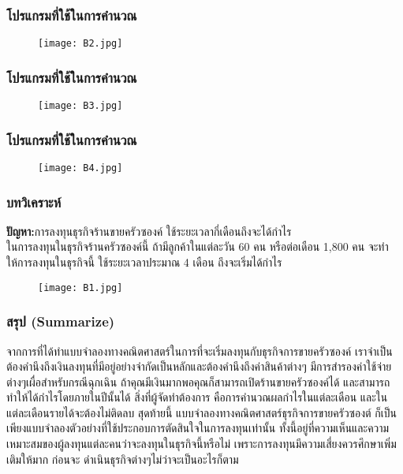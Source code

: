 \documentclass{beamer}
\begin{document}
\begin{frame}
\frametitle{โปรแกรมที่ใช้ในการคำนวณ}
\begin{figure}[h!]
\texttt{[image: B2.jpg]}
\centering
\end{figure}
\end{frame}

\begin{frame}
\frametitle{โปรแกรมที่ใช้ในการคำนวณ}
\begin{figure}[h!]
\texttt{[image: B3.jpg]}
\centering
\end{figure}
\end{frame}

\begin{frame}
\frametitle{โปรแกรมที่ใช้ในการคำนวณ}
\begin{figure}[h!]
\texttt{[image: B4.jpg]}
\centering
\end{figure}
\end{frame}

\begin{frame}
\frametitle{บทวิเคราะห์}
\textbf{ปัญหา:}การลงทุนธุรกิจร้านขายครัวซองค์  ใช้ระยะเวลากี่เดือนถึงจะได้กำไร\\
	ในการลงทุนในธุรกิจร้านครัวซองค์นี้ ถ้ามีลูกค้าในแต่ละวัน 60 คน หรือต่อเดือน 1,800 คน จะทําให้การลงทุนในธุรกิจนี้ ใช้ระยะเวลาประมาณ 4 เดือน ถึงจะเริ่มได้กำไร
\begin{figure}[h!]
\texttt{[image: B1.jpg]}
\centering
\end{figure}
\end{frame}

\begin{frame}
\frametitle{สรุป (Summarize)}
จากการที่ได้ทำแบบจำลองทางคณิตศาสตร์ในการที่จะเริ่มลงทุนกับธุรกิจการขายครัวซองค์ เราจำเป็นต้องคำนึงถึงเงินลงทุนที่มีอยู่อย่างจำกัดเป็นหลักและต้องคำนึงถึงค่าสินค้าต่างๆ มีการสำรองค่าใช้จ่ายต่างๆเผื่อสำหรับกรณีฉุกเฉิน
ถ้าคุณมีเงินมากพอคุณก็สามารถเปิดร้านขายครัวซองค์ได้ และสามารถทำให้ได้กำไรโดยภายในปีนั้นได้
สิ่งที่ผู้จัดทำต้องการ คือการคำนวณผลกำไรในแต่ละเดือน และในแต่ละเดือนรายได้จะต้องไม่ติดลบ
สุดท้ายนี้ แบบจำลองทางคณิตศาสตร์ธุรกิจการขายครัวซองต์ ก็เป็นเพียงแบบจำลองตัวอย่างที่ใช้ประกอบการตัดสินใจในการลงทุนเท่านั้น ทั้งนี้อยู่ที่ความเห็นและความเหมาะสมของผู้ลงทุนแต่ละคนว่าจะลงทุนในธุรกิจนี้หรือไม่ เพราะการลงทุนมีความเสี่ยงควรศึกษาเพิ่มเติมให้มาก ก่อนจะ ดำเนินธุรกิจต่างๆไม่ว่าจะเป็นอะไรก็ตาม
\end{frame}
\end{document}
